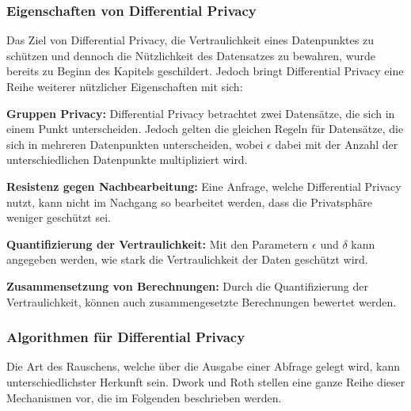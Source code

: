 \subsubsection*{Eigenschaften von Differential Privacy}
Das Ziel von Differential Privacy, die Vertraulichkeit eines Datenpunktes zu schützen und dennoch die Nützlichkeit des Datensatzes zu bewahren, wurde bereits zu Beginn des Kapitels geschildert.
Jedoch bringt Differential Privacy eine Reihe weiterer nützlicher Eigenschaften mit sich\cite{P-27}:
\begin{compactitem}
    \item \textbf{Gruppen Privacy:} Differential Privacy betrachtet zwei Datensätze, die sich in einem Punkt unterscheiden. Jedoch gelten die gleichen Regeln für Datensätze, die sich in mehreren Datenpunkten unterscheiden, wobei $\epsilon$ dabei mit der Anzahl der unterschiedlichen Datenpunkte multipliziert wird.
    \item \textbf{Resistenz gegen Nachbearbeitung:} Eine Anfrage, welche Differential Privacy nutzt, kann nicht im Nachgang so bearbeitet werden, dass die Privatsphäre weniger geschützt sei.
    \item \textbf{Quantifizierung der Vertraulichkeit:} Mit den Parametern $\epsilon$ und $\delta$ kann angegeben werden, wie stark die Vertraulichkeit der Daten geschützt wird.
    \item \textbf{Zusammensetzung von Berechnungen:} Durch die Quantifizierung der Vertraulichkeit, können auch zusammengesetzte Berechnungen bewertet werden.
\end{compactitem}


\subsubsection*{Algorithmen für Differential Privacy}
Die Art des Rauschens, welche über die Ausgabe einer Abfrage gelegt wird, kann unterschiedlichster Herkunft sein.
Dwork und Roth \cite{P-27} stellen eine ganze Reihe dieser Mechanismen vor, die im Folgenden beschrieben werden.

